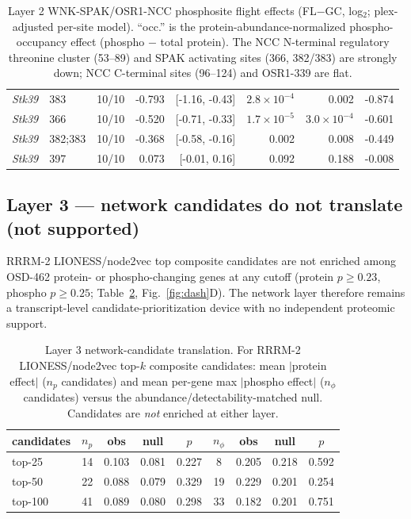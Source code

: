 \documentclass[11pt]{article}
\newcommand{\fail}{\textcolor{red!70!black}{\textbf{not supported}}}
\begin{document}
\begin{table}[htbp]
\begin{tabular}{llcrrrrr}
\textit{Stk39} & 383 & 10/10 & -0.793 & [-1.16, -0.43] & $2.8\times10^{-4}$ & 0.002 & -0.874 \\
\textit{Stk39} & 366 & 10/10 & -0.520 & [-0.71, -0.33] & $1.7\times10^{-5}$ & $3.0\times10^{-4}$ & -0.601 \\
\textit{Stk39} & 382;383 & 10/10 & -0.368 & [-0.58, -0.16] & 0.002 & 0.008 & -0.449 \\
\textit{Stk39} & 397 & 10/10 & 0.073 & [-0.01, 0.16] & 0.092 & 0.188 & -0.008 \\
\bottomrule
\end{tabular}
\caption{Layer 2 WNK-SPAK/OSR1-NCC phosphosite flight effects (FL$-$GC, log$_2$; plex-adjusted per-site model). ``occ.'' is the protein-abundance-normalized phospho-occupancy effect (phospho $-$ total protein). The NCC N-terminal regulatory threonine cluster (53--89) and SPAK activating sites (366, 382/383) are strongly down; NCC C-terminal sites (96--124) and OSR1-339 are flat.}
\label{tab:phospho}
\end{table}

\subsection{Layer 3 --- network candidates do not translate (\fail{})}
RRRM-2 LIONESS/node2vec top composite candidates are not enriched among OSD-462 protein- or
phospho-changing genes at any cutoff (protein $p\geq0.23$,
phospho $p\geq0.25$; Table~\ref{tab:layer3},
Fig.~\ref{fig:dash}D). The network layer therefore remains a transcript-level
candidate-prioritization device with no independent proteomic support.

\begin{table}[htbp]
\centering
\small
\begin{tabular}{lcccccccc}
\toprule
candidates & $n_p$ & obs & null & $p$ & $n_\phi$ & obs & null & $p$ \\
\midrule
top-25 & 14 & 0.103 & 0.081 & 0.227 & 8 & 0.205 & 0.218 & 0.592 \\
top-50 & 22 & 0.088 & 0.079 & 0.329 & 19 & 0.229 & 0.201 & 0.254 \\
top-100 & 41 & 0.089 & 0.080 & 0.298 & 33 & 0.182 & 0.201 & 0.751 \\
\bottomrule
\end{tabular}
\caption{Layer 3 network-candidate translation. For RRRM-2 LIONESS/node2vec top-$k$ composite candidates: mean $|$protein effect$|$ ($n_p$ candidates) and mean per-gene max $|$phospho effect$|$ ($n_\phi$ candidates) versus the abundance/detectability-matched null. Candidates are \emph{not} enriched at either layer.}
\label{tab:layer3}
\end{table}
\end{document}
